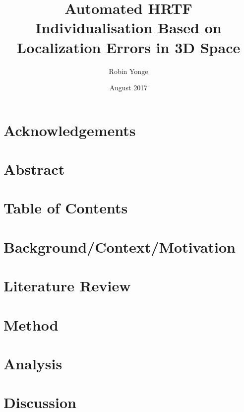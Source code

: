 \documentclass[12pt, a4paper, titlepage, draft]{report}
\begin{document}
\title{Automated HRTF Individualisation Based on Localization Errors in 3D Space}
\author{Robin Yonge}
\date{August 2017}
\maketitle

\section{Acknowledgements}

\section{Abstract}

\section{Table of Contents}

\section{Background/Context/Motivation}


\section{Literature Review}


\section{Method}


\section{Analysis}


\section{Discussion}





\end{document}
